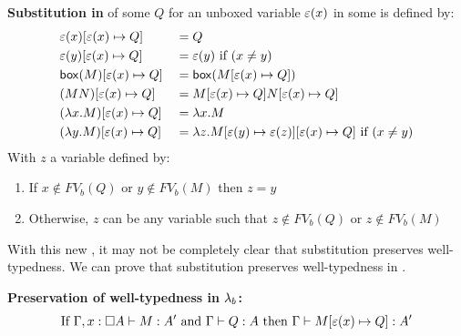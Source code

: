 \begin{definition}
  \label{def:subst}
  \textbf{Substitution in \lab} of some \lterm $Q$ for an unboxed variable $\varepsilon(x)$ in some \lterm is defined by:
  \[
\begin{aligned}
  & \varepsilon(x) [{\varepsilon(x)}\mapsto{Q}]            & &= Q \\
  & \varepsilon(y)  [{\varepsilon(x)}\mapsto{Q}]           & &= \varepsilon(y) \text{ if } (x \neq y)\\
  & \mathsf{box}({M}) [{\varepsilon(x)}\mapsto{Q}]            & &= \mathsf{box}({M [{\varepsilon(x)}\mapsto{Q}]}) \\
  & (M N) [{\varepsilon(x)}\mapsto{Q}]               & &= M [{\varepsilon(x)}\mapsto{Q}] N [{\varepsilon(x)}\mapsto{Q}] \\
  & (\lambda {x}.{M}) [{\varepsilon(x)}\mapsto{Q}]       & &= \lambda {x}.{M} \\
  & (\lambda {y}.{M}) [{\varepsilon(x)}\mapsto{Q}]       & &= \lambda {z}.{M [{\varepsilon(y)}\mapsto{\varepsilon(z)}][{\varepsilon(x)}\mapsto{Q}]} \text{ if } (x \neq y) \\
\end{aligned}
\]
With $z$ a variable defined by:
\begin{enumerate}
  \item%
 If $x \notin FV_b(Q)$ or $y \notin FV_b(M)$ then $z = y$
  \item%
 Otherwise, $z$ can be any variable such that $z \notin FV_b(Q)$ or $z \notin FV_b(M)$
\end{enumerate}
\end{definition}

With this new \lc, it may not be completely clear that substitution preserves well-typedness.
We can prove that substitution preserves well-typedness in \lab.
\begin{proposition}
  \textbf{Preservation of well-typedness in \boldmath${\lambda_b}$:}
  \[
 \mbox{If } \hspace{0.0em} {\Gamma, x : \square{A}} \vdash {M : A'} \hspace{0.0em} \mbox{ and } \hspace{0.0em} {\Gamma} \vdash {Q : A} \hspace{0.0em} \mbox{ then } \hspace{0.0em} {\Gamma} \vdash {M  [{\varepsilon(x)}\mapsto{Q}]  : A'} \hspace{0.0em}
  \]
\end{proposition}

